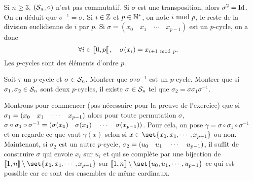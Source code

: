 \documentclass{magnolia}
\begin{document}
\begin{remarques}
\remarque Si $n\geq 3$, $(\mathcal{S}_{n},\circ)$ n'est pas commutatif.
\remarque Si $\sigma$ est une transposition, alors $\sigma^2=\operatorname{Id}$. On en déduit que
  $\sigma^{-1}=\sigma$. 
\remarque Si $i\in\mathbb{Z}$ et $p\in{\mathbb{N}^*}$, on note $i\ {\rm mod}\ p$, le reste de la division
  euclidienne de $i$ par $p$. Si $\sigma=(x_0 \quad x_1 \quad \cdots \quad x_{p-1})$ est
  un $p$-cycle, on a donc
  \[\forall i\in\left\llbracket 0,p\right\llbracket,\quad \sigma(x_i)=x_{i+1\ {\rm mod}\ p}.\]
\remarque Les $p$-cycles sont des éléments d'ordre $p$.
\end{remarques}

\begin{exos}
\exo Soit $\tau$ un $p$-cycle et $\sigma\in\mathcal{S}_{n}$. Montrer que
  $\sigma\tau\sigma^{-1}$ est un $p$-cycle.
\exo Montrer que si $\sigma_1,\sigma_2\in\mathcal{S}_{n}$ sont deux $p$-cycles, il
  existe $\sigma\in\mathcal{S}_{n}$ tel que $\sigma_2=\sigma \sigma_1 \sigma^{-1}$.
  \begin{sol}
  Montrons pour commencer (pas nécessaire pour la preuve de l'exercice) que si $\sigma_1=\left(x_0 \quad x_1 \quad \cdots \quad x_{p-1}\right)$ alors pour toute permutation $\sigma$, $\sigma \circ \sigma_1 \circ \sigma^{-1}=\left(\sigma(x_0) \quad \sigma(x_1) \quad \cdots \quad \sigma(x_{p-1})\right)$. Pour cela, on pose $\gamma=\sigma \circ \sigma_1 \circ \sigma^{-1}$ et on regarde ce que vaut $\gamma(x)$ selon si $x\in \set{x_0,x_1,\cdots,x_{p-1}}$ ou non.\\
  Maintenant, si $\sigma_2$ est un autre $p$-cycle, $\sigma_2=\left(u_0 \quad u_1 \quad \cdots \quad u_{p-1}\right)$, il suffit de construire $\sigma$ qui envoie $x_i$ sur $u_i$ et qui se complète par une bijection de $\intere{1}{n}\setminus \set{x_0,x_1,\cdots,x_{p-1}}$ sur $\intere{1}{n}\setminus \set{u_0,u_1,\cdots,u_{p-1}}$ ce qui est possible car ce sont des ensembles de même cardinaux.
  \end{sol}
\end{exos}
\end{document}
